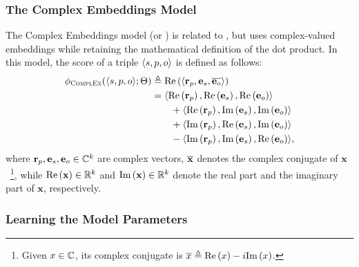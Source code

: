 %
\subsubsection{The Complex Embeddings Model}
%

%
The Complex Embeddings model (or ) is related to , but uses complex-valued embeddings while retaining the mathematical definition of the dot product.
%
In this model, the score of a triple $\langle s, p, o \rangle$ is defined as follows:
%
\begin{equation*}
%
 \begin{aligned}
%
  \fscore_{\mdl{ComplEx}}(\spo ; \params) & \triangleq \ReP{\tdot{\remb{\rp}}{\emb{\rs}}{\conjt{\emb{\ro}}}} \\
%
  & = \tdot{\ReP{\remb{\rp}}}{\ReP{\emb{\rs}}}{\ReP{\emb{\ro}}} \\
  & \qquad + \tdot{\ReP{\remb{\rp}}}{\ImP{\emb{\rs}}}{\ImP{\emb{\ro}}} \\
  & \qquad + \tdot{\ImP{\remb{\rp}}}{\ReP{\emb{\rs}}}{\ImP{\emb{\ro}}} \\
  & \qquad - \tdot{\ImP{\remb{\rp}}}{\ImP{\emb{\rs}}}{\ReP{\emb{\ro}}}, \\
%
 \end{aligned}
\end{equation*}
%
\noindent where $\mathbf{r}_{p}, \mathbf{e}_{s}, \mathbf{e}_{o} \in \mathbb{C}^{k}$ are complex vectors, $\overline{\mathbf{x}}$ denotes the complex conjugate of $\mathbf{x}$~\footnote{Given $x \in \mathbb{C}$, its complex conjugate is $\overline{x} \triangleq \text{Re}\left(x\right) - i \text{Im}\left(x\right)$.}, while 
$\text{Re}\left(\mathbf{x}\right) \in \mathbb{R}^{k}$ and $\text{Im}\left(\mathbf{x}\right) \in \mathbb{R}^{k}$ denote the real part and the imaginary part of $\mathbf{x}$, respectively.
%

%
\subsubsection{Learning the Model Parameters}
%

